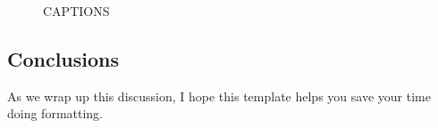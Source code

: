 \documentclass[12pt]{article}
\begin{document}
\begin{figure}[H]
    \centering
    \hfill
    \caption{CAPTIONS}
    \label{fig:two_plots}
\end{figure}


\newpage
\subsection*{Conclusions}
As we wrap up this discussion, I hope this template helps you save your time doing formatting.


\newpage


\end{document}
